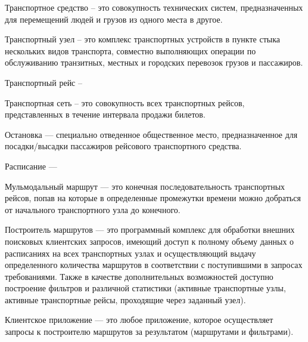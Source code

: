 \begin{definition}
Транспортное средство -- это совокупность технических систем, предназначенных для перемещений людей и грузов из одного места в другое.
\end{definition}

\begin{definition}
Транспортный узел -- это комплекс транспортных устройств в пункте стыка нескольких видов транспорта, совместно выполняющих операции по обслуживанию транзитных, местных и городских перевозок грузов и пассажиров.
\end{definition}

\begin{definition}
Транспортный рейс --
\end{definition}

\begin{definition}
Транспортная сеть -- это совокупность всех транспортных рейсов, представленных в течение интервала продажи билетов.
\end{definition}

\begin{definition}
Остановка — специально отведенное общественное место, предназначенное для посадки/высадки пассажиров рейсового транспортного средства.
\end{definition}

\begin{definition}
Расписание — 
\end{definition}

\begin{definition}
Мульмодальный маршрут — это конечная последовательность транспортных рейсов, попав на которые в определенные промежутки времени можно добраться от начального транспортного узла до конечного.
\end{definition}

\begin{definition}
Построитель маршрутов — это программный комплекс для обработки внешних поисковых клиентских запросов, имеющий доступ к полному объему данных о расписаниях на всех транспортных узлах и осуществляющий выдачу определенного количества маршрутов в соответствии с поступившими в запросах требованиями. Также в качестве дополнительных возможностей доступно построение фильтров и различной статистики (активные транспортные узлы, активные транспортные рейсы, проходящие через заданный узел).
\end{definition}

\begin{definition}
Клиентское приложение — это любое приложение, которое осуществляет запросы к построителю маршрутов за результатом (маршрутами и фильтрами).
\end{definition}

